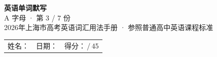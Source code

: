 \documentclass[10pt,a4paper]{article}
\begin{document}
\pagestyle{plain}

\begin{center}
{\LARGE\bfseries 英语单词默写}\\[0.22em]
{\large A 字母 · 第 3 / 7 份}\\[0.18em]
{\small 2026年上海市高考英语词汇用法手册 · 参照普通高中英语课程标准}
\end{center}

\vspace{0.25em}
\noindent\begin{tabular}{@{}p{}@{}p{}@{}p{}@{}}
姓名：\underline{\hspace{2.0cm}} & 日期：\underline{\hspace{2.0cm}} & 得分：\underline{\hspace{1.3cm}}\,/\,45 \\
\end{tabular}

\vspace{0.3em}

\vspace{0.08em}
\end{document}
